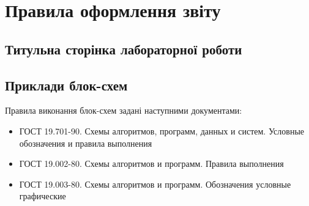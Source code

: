 \chapter{Правила оформлення звіту}
\section{Титульна сторінка лабораторної роботи}

\section{Приклади блок-схем}
Правила виконання блок-схем задані наступними документами:
\begin{itemize}
\item ГОСТ 19.701-90. Схемы алгоритмов, программ, данных и систем. Условные обозначения и правила выполнения
\item ГОСТ 19.002-80. Схемы алгоритмов и программ. Правила выполнения
\item ГОСТ 19.003-80. Схемы алгоритмов и программ. Обозначения условные графические

\end{itemize}


